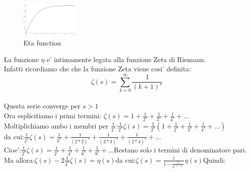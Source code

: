 \documentclass[12pt,a4paper]{article}
\begin{document}
\begin{flushleft}
\begin{figure}[h]
    \centering
    \includegraphics[width=0.25\textwidth]{Eta}
    \caption{Eta function}
    \label{fig:Eta}
\end{figure}
\vspace{5mm}
La funzione $\eta$ e' intimamente legata alla funzione Zeta di Riemann.\\
Infatti ricordiamo che che la funzione Zeta viene cosi' definita:\\
\begin{equation}
\label{eq:ind11}
\zeta(s)=\sum_{k=0}^{\infty}{\frac{1}{(k+1)^s}}
\end{equation}
\\
\vspace{5mm}
Questa serie converge per $s>1$\\
\vspace{5mm}
Ora esplicitiamo i primi termini: $\zeta(s)=1+\frac{1}{2^{s}}+\frac{1}{3^{s}}+\frac{1}{4^{s}}+\dots$\\
\vspace{5mm}
Moltiplichiamo ambo i membri per $\frac{1}{2^{s}}$:\hspace{5mm}$\frac{1}{2^{s}}\zeta(s)=\frac{1}{2^{s}}(1+\frac{1}{2^{s}}+\frac{1}{3^{s}}+\frac{1}{4^{s}}+\dots)$\\
\vspace{5mm}
da cui:\hspace{5mm}$\frac{1}{2^{s}}\zeta(s)=\frac{1}{2^{s}}+\frac{1}{(2*2)^{s}}+\frac{1}{(2*3)^{s}}+\frac{1}{(2*4)^{s}}+\dots$\\
\vspace{5mm}Cioe':\hspace{5mm}$\frac{1}{2^{s}}\zeta(s)=\frac{1}{2^{s}}+\frac{1}{4^{s}}+\frac{1}{6^{s}}+\frac{1}{8^{s}}+\dots$\hspace{2mm}Restano solo i termini di denominatore pari.\\
\vspace{5mm}
Ma allora:\hspace{5mm}$\zeta(s)-2\frac{1}{2^{s}}\zeta(s)=\eta(s)$\hspace{5mm}da cui:\hspace{5mm}$\zeta(s)=\frac{1}{1-\frac{1}{2^{(s-1)}}}\eta(s)$\hspace{5mm}Quindi:\\

\end{flushleft}
\end{document}
